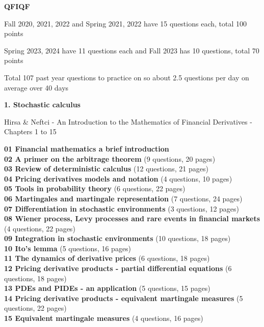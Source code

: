 \documentclass[hidelinks, 12pt]{article}
\theoremstyle{mydefstyle}
\theoremstyle{mythmstyle}
\begin{document}
\newpage

\begin{center}
\textbf{QFIQF}
\end{center}

Fall 2020, 2021, 2022 and Spring 2021, 2022 have 15 questions each, total 100 points

Spring 2023, 2024 have 11 questions each and Fall 2023 has 10 questions, total 70 points

Total 107 past year questions to practice on so about 2.5 questions per day on average over 40 days

\begin{center}
\textbf{1. Stochastic calculus}
\end{center}

Hirsa \& Neftci - An Introduction to the Mathematics of Financial Derivatives - Chapters 1 to 15

\textbf{01 Financial mathematics a brief introduction} \\
\textbf{02 A primer on the arbitrage theorem} (9 questions, 20 pages) \\
\textbf{03 Review of deterministic calculus} (12 questions, 21 pages) \\
\textbf{04 Pricing derivatives models and notation} (4 questions, 10 pages) \\
\textbf{05 Tools in probability theory} (6 questions, 22 pages) \\
\textbf{06 Martingales and martingale representation} (7 questions, 24 pages) \\
\textbf{07 Differentiation in stochastic environments} (3 questions, 12 pages) \\
\textbf{08 Wiener process, Levy processes and rare events in financial markets} (4 questions, 22 pages) \\
\textbf{09 Integration in stochastic environments} (10 questions, 18 pages) \\
\textbf{10 Ito's lemma} (5 questions, 16 pages) \\

\textbf{11 The dynamics of derivative prices} (6 questions, 18 pages) \\
\textbf{12 Pricing derivative products - partial differential equations} (6 questions, 18 pages) \\
\textbf{13 PDEs and PIDEs - an application} (5 questions, 15 pages) \\
\textbf{14 Pricing derivative products - equivalent martingale measures} (5 questions, 22 pages) \\
\textbf{15 Equivalent martingale measures} (4 questions, 16 pages) \\
\end{document}
